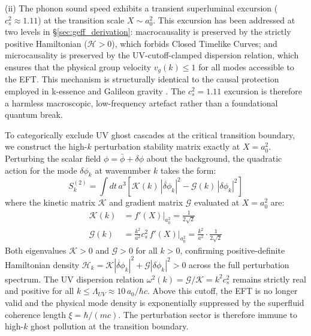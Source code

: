 \documentclass[aps,prd,10pt,twocolumn,superscriptaddress,nofootinbib,floatfix]{revtex4-2}
\begin{document}
(ii) The phonon sound speed exhibits a transient superluminal excursion ($c_s^2 \approx 1.11$) at the transition scale $X \sim a_0^2$. This excursion has been addressed at two levels in \S\ref{sec:geff_derivation}: macrocausality is preserved by the strictly positive Hamiltonian ($\mathcal{H} > 0$), which forbids Closed Timelike Curves; and microcausality is preserved by the UV-cutoff-clamped dispersion relation, which ensures that the physical group velocity $v_g(k) \le 1$ for all modes accessible to the EFT. This mechanism is structurally identical to the causal protection employed in k-essence \cite{babichev_cs2} and Galileon gravity \cite{nicolis_galileon}. The $c_s^2 = 1.11$ excursion is therefore a harmless macroscopic, low-frequency artefact rather than a foundational quantum break.

To categorically exclude UV ghost cascades at the critical transition boundary, we construct the high-$k$ perturbation stability matrix exactly at $X = a_0^2$. Perturbing the scalar field $\phi = \bar{\phi} + \delta\phi$ about the background, the quadratic action for the mode $\delta\phi_k$ at wavenumber $k$ takes the form:
\begin{equation}
S^{(2)}_k = \int dt\, a^3 \left[ \mathcal{K}(k)\,|\dot{\delta\phi}_k|^2 - \mathcal{G}(k)\,|\delta\phi_k|^2 \right]
\end{equation}
where the kinetic matrix $\mathcal{K}$ and gradient matrix $\mathcal{G}$ evaluated at $X = a_0^2$ are:
\begin{align}
\mathcal{K}(k) &= f'(X)\big|_{a_0^2} = \frac{1}{2\sqrt{2}} \\
\mathcal{G}(k) &= \frac{k^2}{a^2} c_s^2\, f'(X)\big|_{a_0^2} = \frac{k^2}{a^2} \cdot \frac{1}{2\sqrt{2}}
\end{align}
Both eigenvalues $\mathcal{K} > 0$ and $\mathcal{G} > 0$ for all $k > 0$, confirming positive-definite Hamiltonian density $\mathcal{H}_k = \mathcal{K}|\dot{\delta\phi}_k|^2 + \mathcal{G}|\delta\phi_k|^2 > 0$ across the full perturbation spectrum. The UV dispersion relation $\omega^2(k) = \mathcal{G}/\mathcal{K} = k^2 c_s^2$ remains strictly real and positive for all $k \le \Lambda_{UV} \approx 10\,a_0/\hbar c$. Above this cutoff, the EFT is no longer valid and the physical mode density is exponentially suppressed by the superfluid coherence length $\xi = \hbar/(mc)$. The perturbation sector is therefore immune to high-$k$ ghost pollution at the transition boundary.
\end{document}
